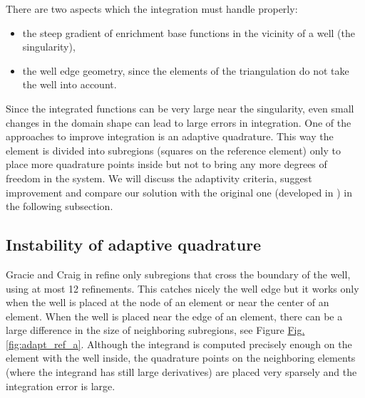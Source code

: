 \documentclass{elsarticle}
\newcommand{\fig}[1]{\hyperref[#1]{Fig.\ref{#1}}}
\begin{document}
There are two aspects which the integration must handle properly:
\begin{itemize}
  \item the steep gradient of enrichment base functions in the vicinity of a well (the singularity),
  \item the well edge geometry, since the elements of the triangulation do not take the well into account.
\end{itemize}

Since the integrated functions can be very large near the singularity, even small changes in the domain shape 
can lead to large errors in integration.
One of the approaches to improve integration is an adaptive quadrature. This way the element is divided into 
subregions (squares on the reference element) only to place more quadrature points inside but not to bring 
any more degrees of freedom in the system. We will discuss the adaptivity criteria, suggest improvement and 
compare our solution with the original one (developed in \cite{gracie_modelling_2010}) in the following subsection. 

\subsection{Instability of adaptive quadrature}
\label{sec:refinement_element}
Gracie and Craig in \cite{gracie_modelling_2010} refine only subregions that cross the boundary of the well, using at most 12 refinements.
This catches nicely the well edge but it works only when the well is placed at the node of an element or near the center of an element. 
When the well is placed near the edge of an element, there can be
a large difference in the size of neighboring subregions, see Figure \fig{fig:adapt_ref_a}. Although
the integrand is computed precisely enough on the element with the well inside, the quadrature points on the
neighboring elements (where the integrand has still large derivatives) are placed very sparsely 
and the integration error is large.
\end{document}

